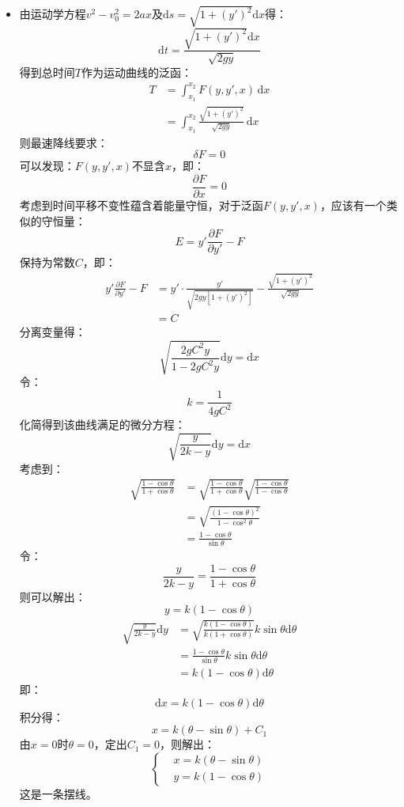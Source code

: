 \documentclass[a4paper,fontset=windows]{ctexart}
\begin{document}
\begin{itemize}
        \item[1.]
        由运动学方程$v^2 - v_0^2 = 2ax$及$\mathrm{d}s = \sqrt{1+(y')^2}\mathrm{d}x$得：
        \[
        \mathrm{d}t = \frac{\sqrt{1+(y')^2}\mathrm{d}x}{\sqrt{2gy}}
        \]
        得到总时间$T$作为运动曲线的泛函：
        \begin{align*}
        T
        &= \int_{x_1}^{x_2}F(y,y',x)\,\mathrm{d}x \\
        &= \int_{x_1}^{x_2}\frac{\sqrt{1+(y')^2}}{\sqrt{2gy}}\,\mathrm{d}x
        \end{align*}
        则最速降线要求：
        \[
        \delta F = 0
        \]
        可以发现：$F(y,y',x)$不显含$x$，即：
        \[
        \frac{\partial F}{\partial x} = 0
        \]
        考虑到时间平移不变性蕴含着能量守恒，对于泛函$F(y,y',x)$，应该有一个类似的守恒量：
        \[
        E = y'\frac{\partial F}{\partial y'} - F
        \]
        保持为常数$C$，即：
        \begin{align*}
        y'\frac{\partial F}{\partial y'} - F
        &= y'\cdot\frac{y'}{\sqrt{2gy[1+(y')^2]}} - \frac{\sqrt{1+(y')^2}}{\sqrt{2gy}} \\
        &= C
        \end{align*}
        分离变量得：
        \[
        \sqrt{\frac{2gC^2 y}{1 - 2gC^2 y}}\mathrm{d}y = \mathrm{d}x
        \]
        令：
        \[
        k = \frac{1}{4gC^2}
        \]
        化简得到该曲线满足的微分方程：
        \[
        \sqrt{\frac{y}{2k - y}}\mathrm{d}y = \mathrm{d}x
        \]
        考虑到：
        \begin{align*}
        \sqrt{\frac{1 - \cos\theta}{1 + \cos\theta}}
        &= \sqrt{\frac{1 - \cos\theta}{1 + \cos\theta}}\sqrt{\frac{1 - \cos\theta}{1 - \cos\theta}} \\
        &= \sqrt{\frac{(1 - \cos\theta)^2}{1 - \cos^2\theta}} \\
        &= \frac{1 - \cos\theta}{\sin\theta}
        \end{align*}
        令：
        \[
        \frac{y}{2k - y} = \frac{1 - \cos\theta}{1 + \cos\theta}
        \]
        则可以解出：
        \[
        y = k(1 - \cos\theta)
        \]
        \begin{align*}
        \sqrt{\frac{y}{2k - y}}\mathrm{d}y
        &= \sqrt{\frac{k(1 - \cos\theta)}{k(1 + \cos\theta)}}k\sin\theta\mathrm{d}\theta \\
        &= \frac{1 - \cos\theta}{\sin\theta}k\sin\theta\mathrm{d}\theta \\
        &= k(1 - \cos\theta)\mathrm{d}\theta
        \end{align*}
        即：
        \[
        \mathrm{d}x = k(1 - \cos\theta)\mathrm{d}\theta
        \]
        积分得：
        \[
        x = k(\theta - \sin\theta) + C_1
        \]
        由$x = 0$时$\theta = 0$，定出$C_1 = 0$，则解出：
        \[
        \left\{
        \begin{aligned}
        & x = k(\theta - \sin\theta) \\
        & y = k(1 - \cos\theta)
        \end{aligned}
        \right.
        \]
        这是一条摆线。
        \bigskip


\end{itemize}
\end{document}
